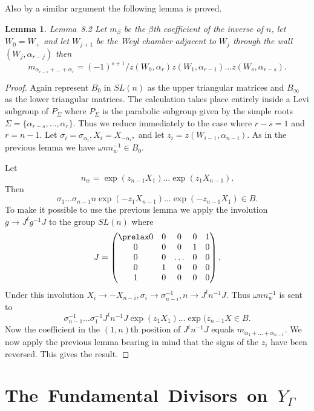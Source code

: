\documentclass{memo-l}
\newtheorem{lemma}[theorem]{Lemma}
\theoremstyle{definition}
\theoremstyle{remark}
\numberwithin{section}{chapter}
\numberwithin{equation}{chapter}
\begin{document}
Also by a similar argument the following lemma is proved.

\medskip

\begin{lemma}{Lemma\ 8.2}  Let $m_{{\beta}}$ be the ${\beta}$th coefficient of
the inverse of $n$, let $W_{0}=W_{+}$ and let $W_{j+1}$ be the Weyl chamber
adjacent to $W_{j}$ through the wall $(W_{j},{\alpha}_{r-j})$ then
$$
m_{\alpha_{r-s}+\ldots +\alpha_{r}} = (-1)^{s+1}/z(W_{0},
{\alpha}_{r})z(W_{1},{\alpha}_{r-1})\ldots z(W_{s},{\alpha}_{r-s}) .
$$
\end{lemma}

\begin{proof}    Again represent $B_{0}$ in $SL(n)$ as the upper triangular
matrices and
$B_{{\infty}}$ as the lower triangular matrices.
 The calculation takes place entirely inside a Levi subgroup of $P_{{\Sigma}}$
where $P_{{\Sigma}}$ is the parabolic subgroup given by the simple roots
${\Sigma} = \{{\alpha}_{r-s},\ldots ,{\alpha}_r\}$.  Thus we reduce immediately
to the case where $r-s = 1$ and $r = n-1$.
 Let ${\sigma}_{i} = {\sigma}_{\alpha_i}, X_{i} =
X_{-\alpha_i},$ and let $z_{i} = z(W_{i-1},{\alpha}_{n-i})$.
 As in the previous lemma we have ${\omega}nn_{w}^{-1} \in B_{0}$.

Let
$$
n_{w} = \exp(z_{n-1}X_{1})\ldots \exp(z_{1}X_{n-1}).
$$
Then
$$
{\sigma}_{1}\ldots {\sigma}_{n-1}n\exp(-z_{1}X_{n-1})\ldots \exp(-z_{n-1}X_{1})
\in B .
$$
To make it possible to use the previous lemma we apply the involution $g {\to}
J^{t}g^{-1}J$ to the group $SL(n)$ where
$$
J =
\begin{pmatrix} \prelax  0 & 0 & 0 & 0 & 1 \\
0 & 0 & 0 & 1 & 0 \\
0 & 0 & \ldots & 0 & 0 \\
0 & 1 & 0 & 0 & 0 \\
1 & 0 & 0 & 0 & 0 \end{pmatrix} .
$$
Under this involution $X_{i} {\to} -X_{n-i}, {\sigma}_{i} {\to}
{\sigma}_{n-i}^{-1}, n {\to} J^{t}n^{-1}J$.
 Thus ${\omega}nn_{w}^{-1}$ is sent to
$$
\sigma_{n-1}^{-1}\ldots {\sigma}_{1}^{-1}J^{t}n^{-1}J\exp(z_{1}X_{1})\ldots
\exp(z_{n-1}X \in B .
$$
Now the coefficient in the $(1,n)$th position of $J^{t}n^{-1}J$ equals
$m_{\alpha_1+\ldots +\alpha_{n-1}}$.  We now apply the
previous lemma bearing in mind that the signs of the $z_{i}$ have been
reversed.
 This gives the result.
\end{proof}

\section{The\  Fundamental\  Divisors\  on\ $Y_\Gamma$}
\end{document}

